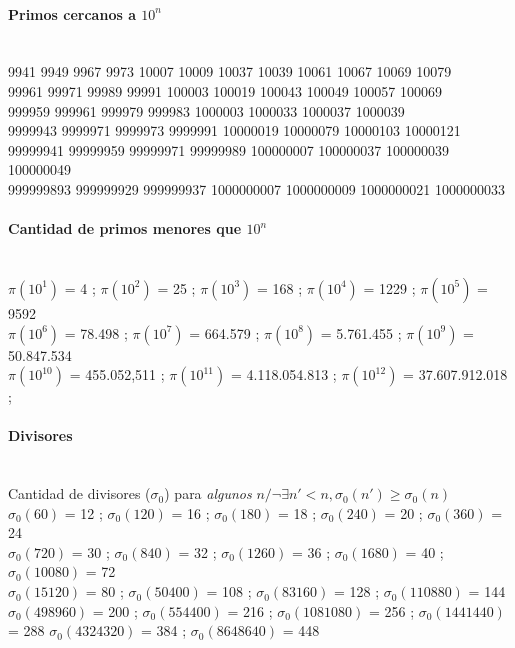 \paragraph{Primos cercanos a $10^n$}\ \\
9941 9949 9967 9973 10007 10009 10037 10039 10061 10067 10069 10079\\
99961 99971 99989 99991 100003 100019 100043 100049 100057 100069\\
999959 999961 999979 999983 1000003 1000033 1000037 1000039\\
9999943 9999971 9999973 9999991 10000019 10000079 10000103 10000121\\
99999941 99999959 99999971 99999989 100000007 100000037 100000039 100000049\\
999999893 999999929 999999937 1000000007 1000000009 1000000021 1000000033
 
\paragraph{Cantidad de primos menores que $10^n$}\ \\
$\pi(10^1)$ = 4 ;
$\pi(10^2)$ = 25 ;
$\pi(10^3)$ = 168 ;
$\pi(10^4)$ = 1229 ;
$\pi(10^5)$ = 9592 \\
$\pi(10^6)$ = 78.498 ;
$\pi(10^7)$ = 664.579 ;
$\pi(10^8)$ = 5.761.455 ;
$\pi(10^9)$ = 50.847.534 \\
$\pi(10^{10})$ = 455.052,511 ;
$\pi(10^{11})$ = 4.118.054.813 ;
$\pi(10^{12})$ = 37.607.912.018 ;
%
%
%

\paragraph{Divisores} \ \\
Cantidad de divisores ($\sigma_0$) para \emph{algunos} $n / \neg\exists n'<n, \sigma_0(n') \geqslant \sigma_0(n)$ \\
$\sigma_0(60)$ = 12 ; $\sigma_0(120)$ = 16 ; $\sigma_0(180)$ = 18 ; $\sigma_0(240)$ = 20 ; $\sigma_0(360)$ = 24 \\
$\sigma_0(720)$ = 30 ; $\sigma_0(840)$ = 32 ; $\sigma_0(1260)$ = 36 ; $\sigma_0(1680)$ = 40 ; $\sigma_0(10080)$ = 72 \\ $\sigma_0(15120)$ = 80 ; $\sigma_0(50400)$ = 108 ; $\sigma_0(83160)$ = 128 ; $\sigma_0(110880)$ = 144 \\
$\sigma_0(498960)$ = 200 ; $\sigma_0(554400)$ = 216 ; $\sigma_0(1081080)$ = 256 ; $\sigma_0(1441440)$ = 288  $\sigma_0(4324320)$ = 384 ; $\sigma_0(8648640)$ = 448
 
